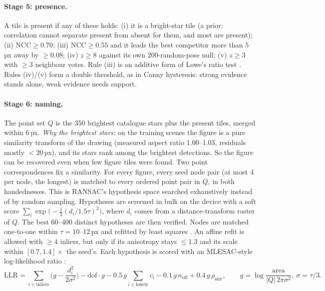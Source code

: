 \documentclass[a4paper,11pt]{article}
\begin{document}
\paragraph{Stage 5: presence.} A tile is present if any of these holds: (i) it is a bright-star tile (a prior:
correlation cannot separate present from absent for them, and most are present); (ii) $\mathrm{NCC}\ge0.70$;
(iii) $\mathrm{NCC}\ge0.55$ and it leads the best competitor more than 5\,px away by $\ge0.08$; (iv) $z\ge8$ against its own
200-random-pose null; (v) $z\ge3$ with $\ge3$ neighbour votes. Rule (iii) is an additive form of Lowe's ratio test
\parencite{lowe2004distinctive}. Rules (iv)/(v) form a double threshold, as in Canny hysteresis: strong evidence stands
alone, weak evidence needs support.

\paragraph{Stage 6: naming.} The point set $Q$ is the 350 brightest catalogue stars plus the present tiles, merged within
6\,px. \emph{Why the brightest stars:} on the training scenes the figure is a pure similarity transform of the drawing
(measured aspect ratio 1.00--1.03, residuals mostly $<20$\,px), and its stars rank among the brightest detections. So
the figure can be recovered even when few figure tiles were found. Two point correspondences fix a similarity. For
every figure, every seed node pair (at most 4 per node, the longest) is matched to every ordered point pair in $Q$, in
both handednesses. This is RANSAC's hypothesis space \parencite{fischler1981ransac} searched exhaustively instead of by random
sampling. Hypotheses are screened in bulk on the device with a soft score
$\sum_i \exp\!\big(-\tfrac12 (d_i/1.5\tau)^2\big)$, where $d_i$ comes from a distance-transform raster of $Q$. The best
60--400 distinct hypotheses are then verified. Nodes are matched one-to-one within $\tau=10$--12\,px and refitted by least
squares \parencite{umeyama1991least}. An affine refit is allowed with $\ge4$ inliers, but only if its anisotropy stays
$\le1.3$ and its scale within $[0.7,1.4]\times$ the seed's. Each hypothesis is scored with an MLESAC-style log-likelihood
ratio \parencite{torr2000mlesac}:
\begin{equation}
\mathrm{LLR} = \sum_{i\in\text{inliers}}\Big(g - \frac{d_i^2}{2\sigma^2}\Big) - \mathrm{dof}\cdot g
 - 0.5\,g\sum_{i\in\text{lonely}} c_i - 0.1\,g\,n_{\text{off}} + 0.4\,g\,\rho_{\text{size}},
\qquad g = \log\frac{\text{area}}{|Q|\,2\pi\sigma^2},\ \sigma=\tau/3 .
\end{equation}
\end{document}
